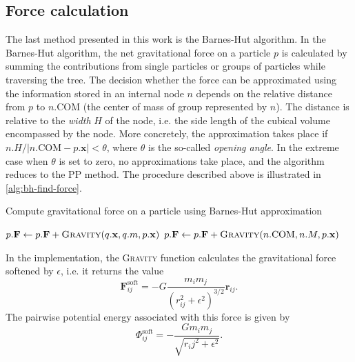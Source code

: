 \subsection{Force calculation}
The last method presented in this work is the Barnes-Hut algorithm.
In the Barnes-Hut algorithm, the net gravitational force on a particle $p$ is calculated by summing the contributions from single particles or groups of particles while traversing the tree.
The decision whether the force can be approximated using the information stored in an internal node $n$ depends on the relative distance from $p$ to $n.\textrm{COM}$ (the center of mass of group represented by $n$).
The distance is relative to the \textit{width} $H$ of the node, i.e. the side length of the cubical volume encompassed by the node.
More concretely, the approximation takes place if $n.H / |n.\mathrm{COM} - p.\mathbf{x}| < \theta$, where $\theta$ is the so-called \textit{opening angle}.
In the extreme case when $\theta$ is set to zero, no approximations take place, and the algorithm reduces to the PP method.
The procedure described above is illustrated in \autoref{alg:bh-find-force}.
\begin{algorithm}
    \caption{Compute gravitational force on a particle using Barnes-Hut approximation}
    \label{alg:bh-find-force}
    \begin{algorithmic}
        \State $p.\mathbf{F} \gets p.\mathbf{F} + \Call{Gravity}{q.\mathbf{x}, q.m, p.\mathbf{x}}$
        \EndIf
        \State \Return
        \EndIf
        \State $p.\mathbf{F} \gets p.\mathbf{F} + \Call{Gravity}{n.\mathrm{COM}, n.M, p.\mathbf{x}}$
        \State \Return
        \EndIf
        \State {}
        \EndFor
        \EndFunction
    \end{algorithmic}
\end{algorithm}
In the implementation, the \textsc{Gravity} function calculates the gravitational force softened by $\epsilon$, i.e. it returns the value
\begin{equation*}
    \mathbf{F}^\textrm{soft}_{ij} = -G\frac{m_i m_j}{(r_{ij}^2 + \epsilon^2)^{3/2}}\mathbf{r}_{ij}.
\end{equation*}
The pairwise potential energy associated with this force is given by
\begin{equation}\label{eq:pe-soft}
    \Phi_{ij}^\textrm{soft} = - \frac{G m_i m_j}{\sqrt{r_ij^2 + \epsilon^2}}.
\end{equation}

